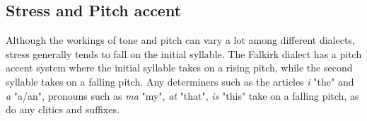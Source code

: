 \documentclass{article}
\begin{document}
\subsection{Stress and Pitch accent}

Although the workings of tone and pitch can vary a lot among different dialects, stress generally
tends to fall on the initial syllable. The Falkirk dialect has a pitch accent system where the initial
syllable takes on a  rising pitch, while the second syllable takes on a falling pitch. Any
determiners such as the articles \emph{i} "the" and \emph{a} "a/an", pronouns such as \emph{ma}
"my",
\emph{at} "that", \emph{is} "this" take on a falling pitch, as do any clitics and suffixes.
\end{document}

